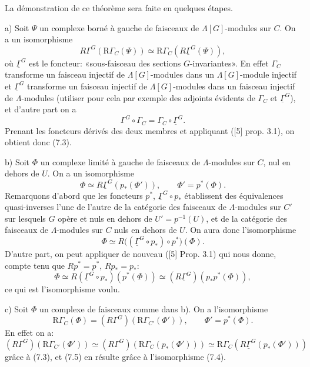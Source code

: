 \documentclass[11pt]{article}
\providecommand{\RG}{\mathrm R\Gamma}
\begin{document}
La démonstration de ce théorème sera faite en quelques étapes.

a) Soit $\Psi$ un complexe borné à gauche de faisceaux de $\Lambda[G]$-modules sur $C$. On a un isomorphisme
\[
R\Gamma^G(\RG_C(\Psi))\simeq\RG_C(R\underline{\Gamma}^G(\Psi)),
\tag{7.3}
\]
où $\underline{\Gamma}^G$ est le foncteur: «sous-faisceau des sections $G$-invariantes». En effet $\Gamma_C$ transforme un faisceau injectif de $\Lambda[G]$-modules dans un $\Lambda[G]$-module injectif et $\underline{\Gamma}^G$ transforme un faisceau injectif de $\Lambda[G]$-modules dans un faisceau injectif de $\Lambda$-modules (utiliser pour cela par exemple des adjoints évidents de $\Gamma_C$ et $\underline{\Gamma}^G$), et d'autre part on a
\[
\Gamma^G\circ\Gamma_C=\Gamma_C\circ\underline{\Gamma}^G.
\]
Prenant les foncteurs dérivés des deux membres et appliquant ([5] prop. 3.1), on obtient donc (7.3).

b) Soit $\Phi$ un complexe limité à gauche de faisceaux de $\Lambda$-modules sur $C$, nul en dehors de $U$. On a un isomorphisme
\[
\Phi\simeq R\underline{\Gamma}^G(p_*(\Phi')),
\qquad \Phi'=p^*(\Phi).
\tag{7.4}
\]
Remarquons d'abord que les foncteurs $p^*$, $\underline{\Gamma}^G\circ p_*$ établissent des équivalences quasi-inverses l'une de l'autre de la catégorie des faisceaux de $\Lambda$-modules sur $C'$ sur lesquels $G$ opère et nuls en dehors de $U'=p^{-1}(U)$, et de la catégorie des faisceaux de $\Lambda$-modules sur $C$ nuls en dehors de $U$. On aura donc l'isomorphisme
\[
\Phi\simeq R\bigl((\underline{\Gamma}^G\circ p_*)\circ p^*\bigr)(\Phi).
\]
D'autre part, on peut appliquer de nouveau ([5] Prop. 3.1) qui nous donne, compte tenu que $Rp^*=p^*$, $Rp_*=p_*$:
\[
\Phi\simeq R(\underline{\Gamma}^G\circ p_*)(p^*(\Phi))
\simeq (R\underline{\Gamma}^G)(p_*p^*(\Phi)),
\]
ce qui est l'isomorphisme voulu.

c) Soit $\Phi$ un complexe de faisceaux comme dans b). On a l'isomorphisme
\[
\RG_C(\Phi)=(R\Gamma^G)(\RG_{C'}(\Phi')),
\qquad \Phi'=p^*(\Phi).
\tag{7.5}
\]
En effet on a:
\[
(R\Gamma^G)(\RG_{C'}(\Phi'))
\simeq
(R\Gamma^G)(\RG_C(p_*(\Phi')))
\simeq
\RG_C(R\underline{\Gamma}^G(p_*(\Phi')))
\]
grâce à (7.3), et (7.5) en résulte grâce à l'isomorphisme (7.4).
\end{document}
